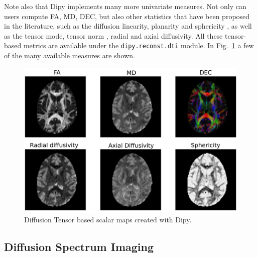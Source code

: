 \documentclass{bioinfo}
\begin{document}
Note also that Dipy implements many more univariate measures. Not
only can users compute FA, MD, DEC, but also other statistics that have been
proposed in the literature, such as the diffusion linearity, planarity and
sphericity \citep{westin:97}, as well as the tensor mode, tensor norm
\citep{Ennis2006}, radial and axial diffusivity. All these tensor-based metrics
are available under the \texttt{dipy.reconst.dti} module. In Fig.~\ref{Fig:dti_metrics} a few of the many available measures are shown.

\begin{figure}
\includegraphics[scale=0.45]{Figures/dti_metrics.jpg}
\centering{}
\caption{Diffusion Tensor based scalar maps created with Dipy. \label{Fig:dti_metrics}}
\end{figure}

\subsection{Diffusion Spectrum Imaging}\label{dsi}
\end{document}

